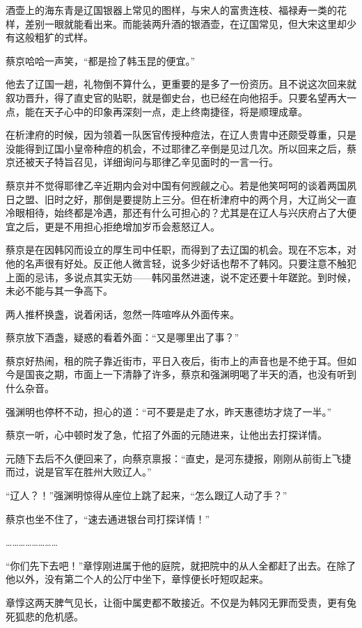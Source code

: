 酒壶上的海东青是辽国银器上常见的图样，与宋人的富贵连枝、福禄寿一类的花样，差别一眼就能看出来。而能装两升酒的银酒壶，在辽国常见，但大宋这里却少有这般粗犷的式样。

蔡京哈哈一声笑，“都是捡了韩玉昆的便宜。”

他去了辽国一趟，礼物倒不算什么，更重要的是多了一份资历。且不说这次回来就叙功晋升，得了直史官的贴职，就是御史台，也已经在向他招手。只要名望再大一点，能在天子心中的印象再深刻一点，走上终南捷径，将是顺理成章。

在析津府的时候，因为领着一队医官传授种痘法，在辽人贵胄中还颇受尊重，只是没能得到辽国小皇帝种痘的机会，不过耶律乙辛倒是见过几次。所以回来之后，蔡京还被天子特旨召见，详细询问与耶律乙辛见面时的一言一行。

蔡京并不觉得耶律乙辛近期内会对中国有何觊觎之心。若是他笑呵呵的谈着两国夙日之盟、旧时之好，那倒是要提防上三分。但在析津府中的两个月，大辽尚父一直冷眼相待，始终都是冷遇，那还有什么可担心的？尤其是在辽人与兴庆府占了大便宜之后，更是不用担心拒绝增加岁币会惹怒辽人。

蔡京是在因韩冈而设立的厚生司中任职，而得到了去辽国的机会。现在不忘本，对他的名声很有好处。反正他人微言轻，说多少好话也帮不了韩冈。只要注意不触犯上面的忌讳，多说点其实无妨——韩冈虽然进速，说不定还要十年蹉跎。到时候，未必不能与其一争高下。

两人推杯换盏，说着闲话，忽然一阵喧哗从外面传来。

蔡京放下酒盏，疑惑的看着外面：“又是哪里出了事？”

蔡京好热闹，租的院子靠近街市，平日入夜后，街市上的声音也是不绝于耳。但如今是国丧之期，市面上一下清静了许多，蔡京和强渊明喝了半天的酒，也没有听到什么杂音。

强渊明也停杯不动，担心的道：“可不要是走了水，昨天惠德坊才烧了一半。”

蔡京一听，心中顿时发了急，忙招了外面的元随进来，让他出去打探详情。

元随下去后不久便回来了，向蔡京禀报：“直史，是河东捷报，刚刚从前街上飞捷而过，说是官军在胜州大败辽人。”

“辽人？！”强渊明惊得从座位上跳了起来，“怎么跟辽人动了手？”

蔡京也坐不住了，“速去通进银台司打探详情！”

……………………

“你们先下去吧！”章惇刚进属于他的庭院，就把院中的从人全都赶了出去。在除了他以外，没有第二个人的公厅中坐下，章惇便长吁短叹起来。

章惇这两天脾气见长，让衙中属吏都不敢接近。不仅是为韩冈无罪而受责，更有兔死狐悲的危机感。

